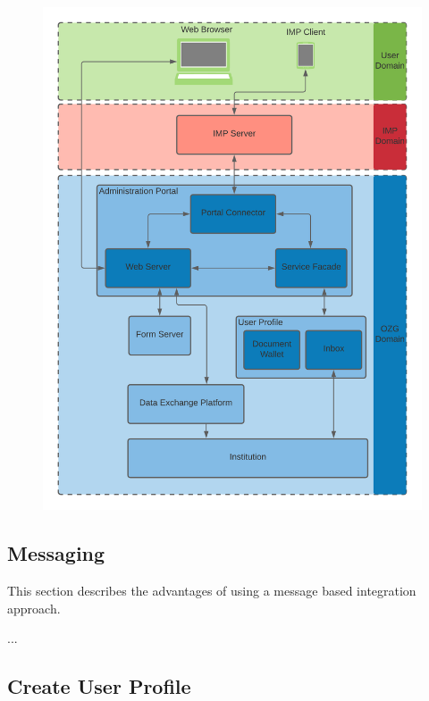 \begin{figure}[h]
    \centering
    \includegraphics[scale=0.15]{Diagrams/Integration Architecture 1/Overview.png}
\end{figure}

\subsection{Messaging}

This section describes the advantages of using a message based integration approach.

...

\subsection{Create User Profile}

